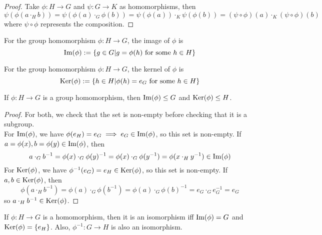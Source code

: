 \documentclass[a4paper]{article}
\begin{document}
\begin{proof}
Take $\phi:H\rightarrow G$ and $\psi:G\rightarrow K$ as homomorphisms, then
$$\psi(\phi(a\cdot_Hb))=\psi(\phi(a)\cdot_G\phi(b))=\psi(\phi(a))\cdot_K\psi(\phi(b))=(\psi\circ \phi)(a)\cdot_K(\psi\circ\phi)(b)$$
where $\psi\circ\phi$ represents the composition.
\end{proof}
\begin{defi}[Image]
For the group homomorphism $\phi:H\rightarrow G$, the image of $\phi$ is
$$\operatorname{Im}(\phi):=\{g\in G|g=\phi(h)\text{  for some } h\in H\}$$
\end{defi}
\begin{defi}[Kernel]
For the group homomorphism $\phi:H\rightarrow G$, the kernel of $\phi$ is
$$\operatorname{Ker}(\phi):=\{h\in H|\phi(h)=e_G\text{  for some } h\in H\}$$
\end{defi}
\begin{prop}
If $\phi:H\rightarrow G$ is a group homomorphism, then $\operatorname{Im}(\phi)\leq G$ and $\operatorname{Ker}(\phi)\leq H$.
\end{prop}
\begin{proof}
For both, we check that the set is non-empty before checking that it is a subgroup.\\[5pt]
For $\operatorname{Im}(\phi)$, we have $\phi(e_H)=e_G\implies e_G\in\operatorname{Im}(\phi)$, so this set is non-empty. If $a=\phi(x),b=\phi(y)\in\operatorname{Im}(\phi)$, then
$$a\cdot_Gb^{-1}=\phi(x)\cdot_G\phi(y)^{-1}=\phi(x)\cdot_G\phi(y^{-1})=\phi(x\cdot_Hy^{-1})\in\operatorname{Im}(\phi)$$
For $\operatorname{Ker}(\phi)$, we have $\phi^{-1}(e_G)=e_H\in\operatorname{Ker}(\phi)$, so this set is non-empty. If $a,b\in\operatorname{Ker}(\phi)$, then
$$\phi(a\cdot_Hb^{-1})=\phi(a)\cdot_G\phi(b^{-1})=\phi(a)\cdot_G\phi(b)^{-1}=e_G\cdot_Ge_G^{-1}=e_G$$
so $a\cdot_Hb^{-1}\in\operatorname{Ker}(\phi)$.
\end{proof}
\begin{lemma}
If $\phi:H\rightarrow G$ is a homomorphism, then it is an isomorphism iff $\operatorname{Im}(\phi)=G$ and $\operatorname{Ker}(\phi)=\{e_H\}$. Also, $\phi^{-1}:G\rightarrow H$ is also an isomorphism.
\end{lemma}
\end{document}
